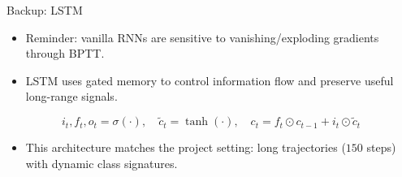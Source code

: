 \begin{frame}{Backup: LSTM}
\small
\begin{itemize}[<+->]
  \item Reminder: vanilla RNNs are sensitive to vanishing/exploding gradients through BPTT.
  \item LSTM uses gated memory to control information flow and preserve useful long-range signals.
\end{itemize}
\vspace{-0.2em}
\[
i_t,f_t,o_t=\sigma(\cdot),\quad \tilde{c}_t=\tanh(\cdot),\quad
c_t=f_t\odot c_{t-1}+i_t\odot \tilde{c}_t
\]
\vspace{-0.6em}
\small
\begin{itemize}[<+->]
  \item This architecture matches the project setting: long trajectories (\(150\) steps) with dynamic class signatures.
\end{itemize}
\end{frame}


